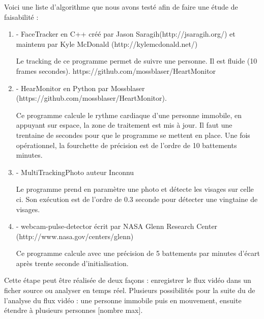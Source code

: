 \documentclass[12pt,a4paper]{article}
\begin{document}
Voici une liste d'algorithme que nous avons testé afin de faire une étude de faisabilité : 

\begin{enumerate}

\item[] - FaceTracker en C++ 
créé par Jason Saragih(http://jsaragih.org/) et maintenu par Kyle McDonald (http://kylemcdonald.net/)

Le tracking de ce programme permet de suivre une personne. Il est fluide (10 frames secondes).
https://github.com/mossblaser/HeartMonitor
\item[] - HearMonitor en Python par Mossblaser (https://github.com/mossblaser/HeartMonitor).

Ce programme calcule le rythme cardiaque d'une personne immobile, en appuyant sur espace, la zone de traitement est mis à jour. Il faut une trentaine de secondes pour que le programme se mettent en place. 
Une fois opérationnel, la fourchette de précision est de l'ordre de 10 battements minutes.

\item[] - MultiTrackingPhoto auteur Inconnu 

Le programme prend en paramètre une photo et détecte les visages sur celle ci.
Son exécution est de l'ordre de 0.3 seconde pour détecter une vingtaine de visages.

 \item[] - webcam-pulse-detector écrit par NASA Glenn Research Center (http://www.nasa.gov/centers/glenn)

Ce programme calcule avec une précision de 5 battements par minutes d'écart après trente seconde d'initialisation.

\end{enumerate}



Cette étape peut être réalisée de deux façons : enregistrer le flux vidéo dans un ficher source ou analyser en temps réel.
Plusieurs possibilités pour la suite du de l'analyse du flux vidéo : une personne immobile puis en mouvement, ensuite étendre à plusieurs personnes [nombre max].
\end{document}
